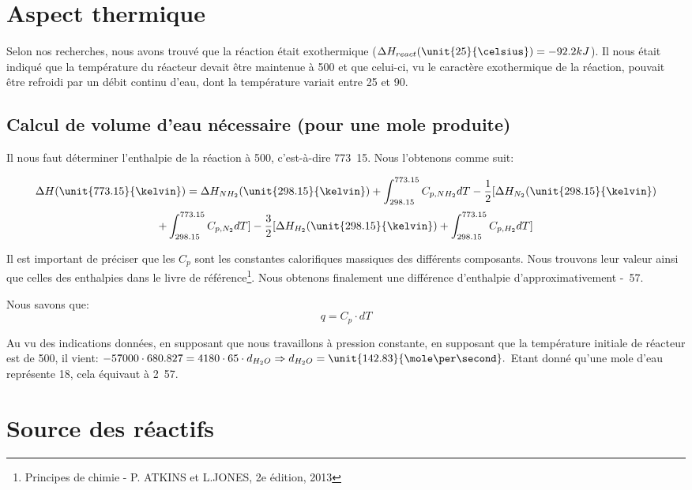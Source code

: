\documentclass[11pt,a4paper]{report}
\begin{document}
\section*{Aspect thermique}
Selon nos recherches, nous avons trouvé que la réaction était exothermique ($\Delta H_{react}(\unit{25}{\celsius}) = -92.2kJ$).
Il nous était indiqué que la température du réacteur devait être maintenue à \unit{500}{\celsius} et que celui-ci, 
vu le caractère exothermique de la réaction, pouvait être refroidi par un débit continu d'eau, dont la température 
variait entre \unit{25}{\celsius} et \unit{90}{\celsius}.

\subsection*{Calcul de volume d'eau nécessaire (pour une mole produite)}

Il nous faut déterminer l'enthalpie de la réaction à \unit{500}{\celsius}, c'est-à-dire \unit{773.15}{\kelvin}.
Nous l'obtenons comme suit:

$$\Delta H(\unit{773.15}{\kelvin}) = \Delta H_{NH_2}(\unit{298.15}{\kelvin}) + \int_{298.15}^{773.15} C_{p, NH_2} dT 
 - \frac{1}{2} \lbrack \Delta H_{N_2}(\unit{298.15}{\kelvin}) $$ 
$$+ \int_{298.15}^{773.15} C_{p, N_2} dT \rbrack - \frac{3}{2}  \lbrack \Delta H_{H_2}(\unit{298.15}{\kelvin}) + \int_{298.15}^{773.15} C_{p, H_2} dT  \rbrack $$

Il est important de préciser que les $C_{p}$ sont les constantes calorifiques massiques des différents composants. 
Nous trouvons leur valeur ainsi que celles des enthalpies dans le livre de référence\footnote{Principes de chimie - P. ATKINS et L.JONES, 2e édition, 2013}.
Nous obtenons finalement une différence d'enthalpie d'approximativement \unit{-57}{\kilo\joule}.

Nous savons que:
$$q =  C_p \cdot dT$$

Au vu des indications données, en supposant que nous travaillons à pression constante, en supposant que la température initiale de
réacteur est de \unit{500}{\celsius}, il vient:
$-57000 \cdot 680.827 = 4180 \cdot 65 \cdot d_{H_{2}O} \Rightarrow  d_{H_{2}O} = \unit{142.83}{\mole\per\second}.$
Etant donné qu'une mole d'eau représente \unit{18}{\gram}, cela équivaut à  \unit{2.57}{\kilogram\per\second}.

\section*{Source des réactifs}
\end{document}
